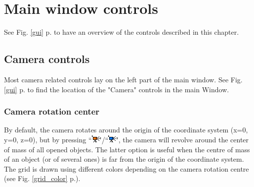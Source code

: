 \chapter{Main window controls}
\minitoc  


See Fig. \ref{gui} p.\pageref{gui} to have an overview of the controls described in this chapter.



 \section{Camera controls}
Most camera related controls lay on the left part of the main window. See Fig. \ref{gui} p.\pageref{gui} to find the location of the "Camera" controls in the main Window.
\subsection{Camera rotation center}
By default, the camera rotates around the origin of the coordinate system (x=0, y=0, z=0), but by pressing ``\includegraphics[scale=0.7]{images/06/camera/move_cam.png}"/``\includegraphics[scale=0.7]{images/06/camera/move_cam2.png}", the camera will revolve around the center of mass of all opened objects. The latter option is useful when the centre of mass of an object (or of several ones) is far from the origin of the coordinate system. The grid is drawn using different colors depending on the camera rotation centre (see Fig. \ref{grid_color} p.\pageref{grid_color}). %

